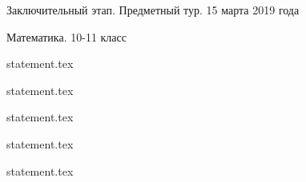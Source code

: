 \documentclass[a4paper,11pt, oneside]{book}
\begin{document}
\vspace{-3mm}
\vspace{-5mm}

\normalsize

\begin{center}
    Заключительный этап. Предметный тур. 15 марта 2019 года
    
    Математика. 10-11 класс
\end{center}

\parindent=0cm

{statement.tex}

{statement.tex}

{statement.tex}

\clearpage

{statement.tex}

{statement.tex}
\end{document}
